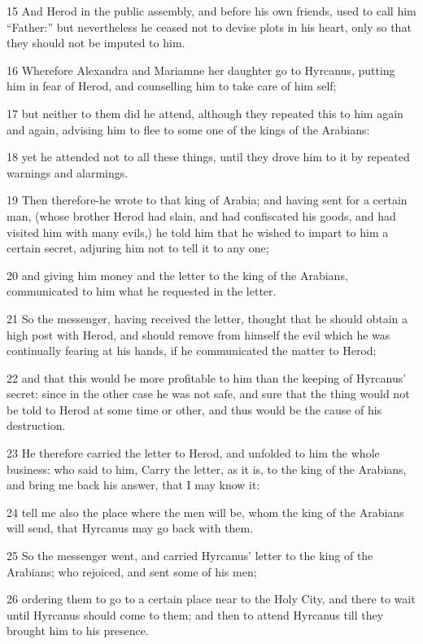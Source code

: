 15 And Herod in the public assembly, and before his own friends, used to call him “Father:” but nevertheless he ceased not to devise plots in his heart, only so that they should not be imputed to him. 

16 Wherefore Alexandra and Mariamne her daughter go to Hyrcanus, putting him in fear of Herod, and counselling him to take care of him self; 

17 but neither to them did he attend, although they repeated this to him again and again, advising him to flee to some one of the kings of the Arabians: 

18 yet he attended not to all these things, until they drove him to it by repeated warnings and alarmings. 

19 Then therefore-he wrote to that king of Arabia; and having sent for a certain man, (whose brother Herod had slain, and had confiscated his goods, and had visited him with many evils,) he told him that he wished to impart to him a certain secret, adjuring him not to tell it to any one; 

20 and giving him money and the letter to the king of the Arabians, communicated to him what he requested in the letter. 

21 So the messenger, having received the letter, thought that he should obtain a high post with Herod, and should remove from himself the evil which he was continually fearing at his hands, if he communicated the matter to Herod; 

22 and that this would be more profitable to him than the keeping of Hyrcanus’ secret: since in the other case he was not safe, and sure that the thing would not be told to Herod at some time or other, and thus would be the cause of his destruction. 

23 He therefore carried the letter to Herod, and unfolded to him the whole business: who said to him, Carry the letter, as it is, to the king of the Arabians, and bring me back his answer, that I may know it: 

24 tell me also the place where the men will be, whom the king of the Arabians will send, that Hyrcanus may go back with them. 

25 So the messenger went, and carried Hyrcanus’ letter to the king of the Arabians; who rejoiced, and sent some of his men; 

26 ordering them to go to a certain place near to the Holy City, and there to wait until Hyrcanus should come to them; and then to attend Hyrcanus till they brought him to his presence. 

